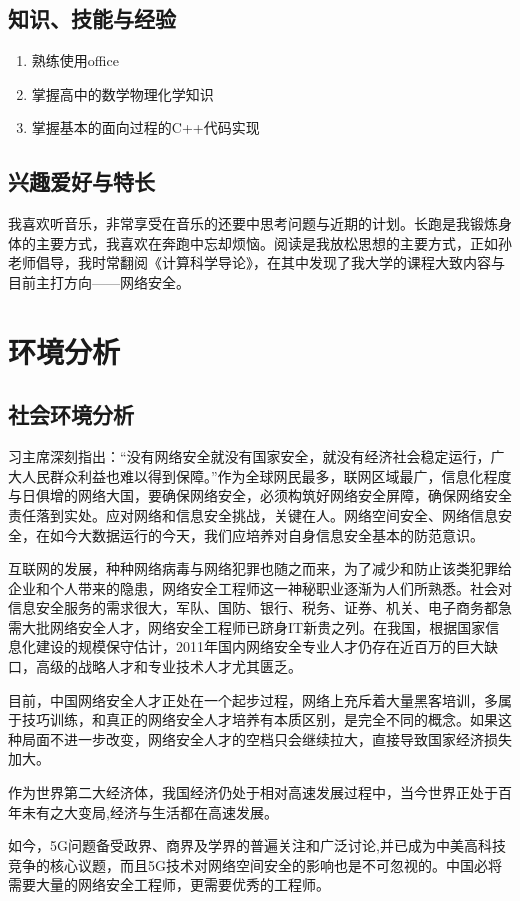 \documentclass{article}
\begin{document}
\subsection{知识、技能与经验}
\begin{enumerate}[(1)]
	\item 熟练使用office
	\item 掌握高中的数学物理化学知识
	\item 掌握基本的面向过程的C++代码实现
\end{enumerate}
\par

\subsection{兴趣爱好与特长}
我喜欢听音乐，非常享受在音乐的还要中思考问题与近期的计划。长跑是我锻炼身体的主要方式，我喜欢在奔跑中忘却烦恼。阅读是我放松思想的主要方式，正如孙老师倡导，我时常翻阅《计算科学导论》，在其中发现了我大学的课程大致内容与目前主打方向——网络安全。\par

\section{环境分析}

\subsection{社会环境分析}
习主席深刻指出：“没有网络安全就没有国家安全，就没有经济社会稳定运行，广大人民群众利益也难以得到保障。”作为全球网民最多，联网区域最广，信息化程度与日俱增的网络大国，要确保网络安全，必须构筑好网络安全屏障，确保网络安全责任落到实处。应对网络和信息安全挑战，关键在人。网络空间安全、网络信息安全，在如今大数据运行的今天，我们应培养对自身信息安全基本的防范意识。\par
互联网的发展，种种网络病毒与网络犯罪也随之而来，为了减少和防止该类犯罪给企业和个人带来的隐患，网络安全工程师这一神秘职业逐渐为人们所熟悉。社会对信息安全服务的需求很大，军队、国防、银行、税务、证券、机关、电子商务都急需大批网络安全人才，网络安全工程师已跻身IT新贵之列。在我国，根据国家信息化建设的规模保守估计，2011年国内网络安全专业人才仍存在近百万的巨大缺口，高级的战略人才和专业技术人才尤其匮乏。\par
目前，中国网络安全人才正处在一个起步过程，网络上充斥着大量黑客培训，多属于技巧训练，和真正的网络安全人才培养有本质区别，是完全不同的概念。如果这种局面不进一步改变，网络安全人才的空档只会继续拉大，直接导致国家经济损失加大。\par
作为世界第二大经济体，我国经济仍处于相对高速发展过程中，当今世界正处于百年未有之大变局,经济与生活都在高速发展。\par
如今，5G问题备受政界、商界及学界的普遍关注和广泛讨论,并已成为中美高科技竞争的核心议题，而且5G技术对网络空间安全的影响也是不可忽视的。中国必将需要大量的网络安全工程师，更需要优秀的工程师。\par
\end{document}
